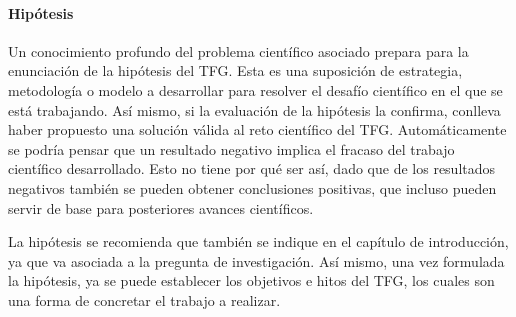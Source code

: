 \paragraph{Hipótesis} Un conocimiento profundo del problema científico asociado prepara para la enunciación de la hipótesis del TFG. Esta es una suposición de estrategia, metodología o modelo a desarrollar para resolver el desafío científico en el que se está trabajando. Así mismo, si la evaluación de la hipótesis la confirma, conlleva haber propuesto una solución válida al reto científico del TFG. Automáticamente se podría pensar que un resultado negativo implica el fracaso del trabajo científico desarrollado. Esto no tiene por qué ser así, dado que de los resultados negativos también se pueden obtener conclusiones positivas, que incluso pueden servir de base para posteriores avances científicos.

La hipótesis se recomienda que también se indique en el capítulo de introducción, ya que va asociada a la pregunta de investigación. Así mismo, una vez formulada la hipótesis, ya se puede establecer los objetivos e hitos del TFG, los cuales son una forma de concretar el trabajo a realizar.

